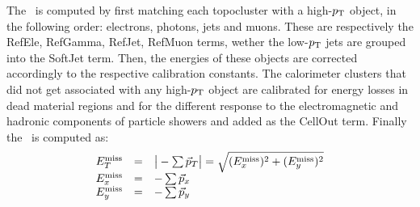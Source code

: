 The \met\ is computed by first matching each topocluster
with a high-$\pt$ object,  in the following order: electrons, photons, jets and muons.
These are respectively the RefEle, RefGamma, RefJet, RefMuon terms, wether the low-$\pt$ jets
are grouped into the SoftJet term. Then, the energies of these objects are
corrected accordingly to the respective calibration constants. 
The calorimeter clusters
that did not get associated with any  high-$\pt$ object are calibrated for energy losses in 
dead material regions and for the different response to the electromagnetic and hadronic
components of particle showers and added as the CellOut term. 
Finally the \met\ is computed as:
\begin{equation}\label{eq:met}
\begin{array}{lcl}
E^{\rm miss}_{T} & = & \big|-\sum\vec{p}_T \big| = \sqrt{(E^{\rm miss}_{x})^2 + (E^{\rm miss}_{y})^2}\\
E^{\rm miss}_{x} & = & -\sum\vec{p}_x\\
E^{\rm miss}_{y} & = & -\sum\vec{p}_y\\
\end{array}	\end{equation}

